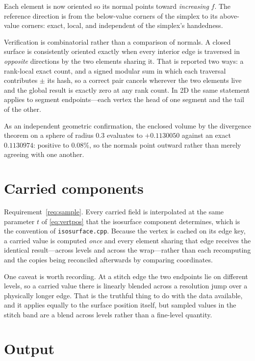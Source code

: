 Each element is now oriented so its normal points toward \emph{increasing} $f$.
The reference direction is from the below-value corners of the simplex to its
above-value corners: exact, local, and independent of the simplex's handedness.

Verification is combinatorial rather than a comparison of normals. A closed
surface is consistently oriented exactly when every interior edge is traversed
in \emph{opposite} directions by the two elements sharing it. That is reported
two ways: a rank-local exact count, and a signed modular sum in which each
traversal contributes $\pm$ its hash, so a correct pair cancels wherever the two
elements live and the global result is exactly zero at any rank count. In 2D the
same statement applies to segment endpoints---each vertex the head of one
segment and the tail of the other.

As an independent geometric confirmation, the enclosed volume by the divergence
theorem on a sphere of radius $0.3$ evaluates to $+0.1130050$ against an exact
$0.1130974$: positive to $0.08\%$, so the normals point outward rather than
merely agreeing with one another.

\section{Carried components}
\label{sec:carried}

Requirement~\ref{req:sample}. Every carried field is interpolated at the same
parameter $t$ of \cref{eq:vertpos} that the isosurface component determines,
which is the convention of \texttt{isosurface.cpp}. Because the vertex is cached
on its edge key, a carried value is computed \emph{once} and every element
sharing that edge receives the identical result---across levels and across the
wrap---rather than each recomputing and the copies being reconciled afterwards
by comparing coordinates.

One caveat is worth recording. At a stitch edge the two endpoints lie on
different levels, so a carried value there is linearly blended across a
resolution jump over a physically longer edge. That is the truthful thing to do
with the data available, and it applies equally to the surface position itself,
but sampled values in the stitch band are a blend across levels rather than a
fine-level quantity.

\section{Output}

